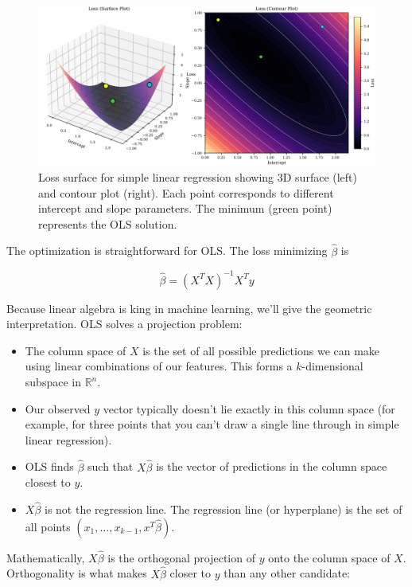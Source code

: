 \begin{figure}[H]
\centering
\includegraphics[width=\textwidth]{images/linear_reg_loss_surface.pdf}
\caption{Loss surface for simple linear regression showing 3D surface (left) and contour plot (right). Each point corresponds to different intercept and slope parameters. The minimum (green point) represents the OLS solution.}
\label{fig:loss-surface}
\end{figure}

The optimization is straightforward for OLS. The loss minimizing $\hat{\beta}$ is

\begin{equation}
\hat{\beta} = (X^TX)^{-1} X^T y
\label{eq:ols-solution}
\end{equation}

Because linear algebra is king in machine learning, we'll give the geometric interpretation. OLS solves a projection problem:

\begin{itemize}
\item The column space of $X$ is the set of all possible predictions we can make using linear combinations of our features. This forms a $k$-dimensional subspace in $\mathbb{R}^n$.
\item Our observed $y$ vector typically doesn't lie exactly in this column space (for example, for three points that you can't draw a single line through in simple linear regression).
\item OLS finds $\hat{\beta}$ such that $X\hat{\beta}$ is the vector of predictions in the column space closest to $y$.
\item $X\hat{\beta}$ is not the regression line. The regression line (or hyperplane) is the set of all points $(x_1, \dots ,x_{k-1}, x^T\hat{\beta})$.
\end{itemize}

Mathematically, $X\hat{\beta}$ is the orthogonal projection of $y$ onto the column space of $X$. Orthogonality is what makes $X\hat{\beta}$ closer to $y$ than any other candidate:

